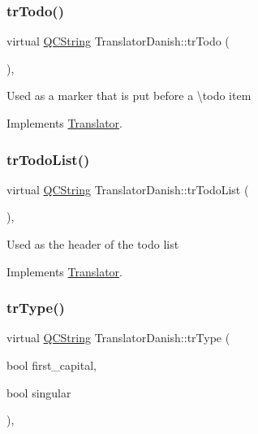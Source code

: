 \subsubsection{\texorpdfstring{trTodo()}{trTodo()}}
{\footnotesize\ttfamily virtual \mbox{\hyperlink{class_q_c_string}{Q\+C\+String}} Translator\+Danish\+::tr\+Todo (\begin{DoxyParamCaption}{ }\end{DoxyParamCaption})\hspace{0.3cm}{\ttfamily [inline]}, {\ttfamily [virtual]}}

Used as a marker that is put before a \textbackslash{}todo item 

Implements \mbox{\hyperlink{class_translator}{Translator}}.

\mbox{\label{class_translator_danish_a42583f7fe0e755408b18b133be7b8264}} 
\subsubsection{\texorpdfstring{trTodoList()}{trTodoList()}}
{\footnotesize\ttfamily virtual \mbox{\hyperlink{class_q_c_string}{Q\+C\+String}} Translator\+Danish\+::tr\+Todo\+List (\begin{DoxyParamCaption}{ }\end{DoxyParamCaption})\hspace{0.3cm}{\ttfamily [inline]}, {\ttfamily [virtual]}}

Used as the header of the todo list 

Implements \mbox{\hyperlink{class_translator}{Translator}}.

\mbox{\label{class_translator_danish_ad824f35152e985879e8c48603393687b}} 
\subsubsection{\texorpdfstring{trType()}{trType()}}
{\footnotesize\ttfamily virtual \mbox{\hyperlink{class_q_c_string}{Q\+C\+String}} Translator\+Danish\+::tr\+Type (\begin{DoxyParamCaption}\item[{bool}]{first\+\_\+capital,  }\item[{bool}]{singular }\end{DoxyParamCaption})\hspace{0.3cm}{\ttfamily [inline]}, {\ttfamily [virtual]}}

